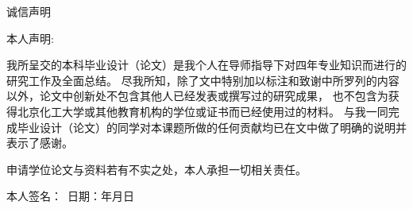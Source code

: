 \begin{center}
\heiti 诚信声明
\end{center}
\vspace*{2\baselineskip}
\noindent 本人声明:\par
\vspace*{\baselineskip}
我所呈交的本科毕业设计（论文）是我个人在导师指导下对四年专业知识而进行的研究工作及全面总结。
尽我所知，除了文中特别加以标注和致谢中所罗列的内容以外，论文中创新处不包含其他人已经发表或撰写过的研究成果，
也不包含为获得北京化工大学或其他教育机构的学位或证书而已经使用过的材料。
与我一同完成毕业设计（论文）的同学对本课题所做的任何贡献均已在文中做了明确的说明并表示了感谢。\par
申请学位论文与资料若有不实之处，本人承担一切相关责任。
\vspace*{\baselineskip}
\par
本人签名：~\underline{\hspace{7em}}\hspace{6em}日期：\hspace{2.5em}年\hspace{2.5em}月\hspace{2.5em}日